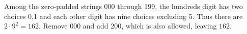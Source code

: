 Among the zero-padded strings 000 through 199, the hundreds digit has two choices 0,1 and each other digit has nine choices excluding 5. Thus there are $2\cdot9^2=162$. Remove 000 and add 200, which is also allowed, leaving $\boxed{162}$.
